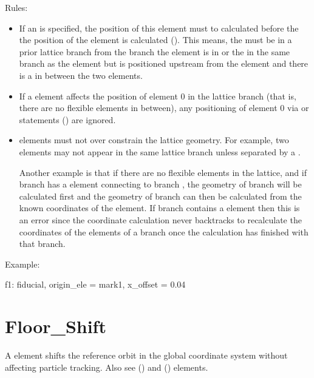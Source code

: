 Rules: 
  \begin{itemize}
  \item
If an  is specified, the position of this element must
to calculated before the the position of the  element is
calculated (). This means, the  must be in
a prior lattice branch from the branch the  element is in
or the  in the same branch as the  element
but is positioned upstream from the  element and there is
a   in between the two elements.
  \item
If a  element affects the position of element 0 in the
lattice branch (that is, there are no flexible  elements
in between), any positioning of element 0 via  or
 statements () are ignored.
  \item
{} elements must not over constrain the lattice geometry.
For example, two  elements may not appear in the same
lattice branch unless separated by a  . 

Another example is that if there are no flexible  elements
in the lattice, and if branch  has a  element
connecting to branch , the geometry of branch  will be
calculated first and the geometry of branch  can then be
calculated from the known coordinates of the  element. If
branch  contains a  element then this is an error
since the coordinate calculation never backtracks to recalculate the
coordinates of the elements of a branch once the calculation has
finished with that branch.
  \end{itemize}

Example:
\begin{example}
  f1: fiducial, origin_ele = mark1, x_offset = 0.04
\end{example}

\section{Floor_Shift}
\label{s:floor.ele}

A  element shifts the reference orbit in the global
coordinate system without affecting particle tracking. Also see
 () and  ()
elements.

